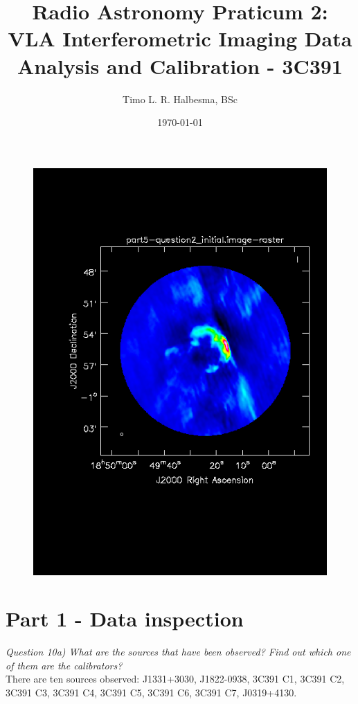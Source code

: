 \documentclass[12pt, a4paper]{article}
\title{Radio Astronomy Praticum 2: VLA Interferometric Imaging Data Analysis and Calibration - 3C391}
\author{Timo L. R. Halbesma, BSc}
\date{\today}
\begin{document}
\maketitle
\vfill
\begin{figure}[h!]
    \centering
    \includegraphics[scale=0.5]{../Imaging/plots2/postcal.png}
\end{figure}
\vfill
{}

\newpage

\section{Part 1 - Data inspection}
\noindent \textit{Question 10a) What are the sources that have been observed? Find out which one of them are the calibrators?} \\
There are ten sources observed:  J1331+3030, J1822-0938, 3C391 C1, 3C391 C2, 3C391 C3, 3C391 C4, 3C391 C5, 3C391 C6, 3C391 C7, J0319+4130.
\end{document}
